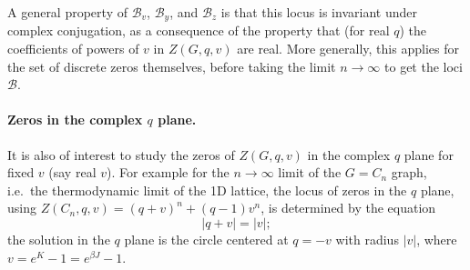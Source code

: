 A general property of $\mathcal B_v$, $\mathcal B_y$, and $\mathcal B_z$ is that this locus is invariant under
complex conjugation, as a consequence of the property that (for real $q$) the coefficients of powers of $v$ in
$Z(G,q,v)$ are real. More generally, this applies for the set of discrete zeros themselves, before taking the limit
$n\to\infty$ to get the loci $\mathcal B$.

\paragraph{Zeros in the complex $q$ plane.} It is also of interest to study the zeros of $Z(G,q,v)$ in the complex
$q$ plane for fixed $v$ (say real $v$). For example for the $n\to\infty$ limit of the $G = C_n$ graph, i.e.\ the
thermodynamic limit of the 1D lattice, the locus of zeros in the $q$ plane, using
$Z(C_n,q,v) = (q+v)^n + (q-1)v^n$, is determined by the equation
\begin{equation}
  |q+v| = |v|;
\end{equation}
the solution in the $q$ plane is the circle centered at $q = -v$ with radius $|v|$, where $v = e^K-1 = e^{\beta J}-1$.

\begin{diagram}
\end{diagram}

